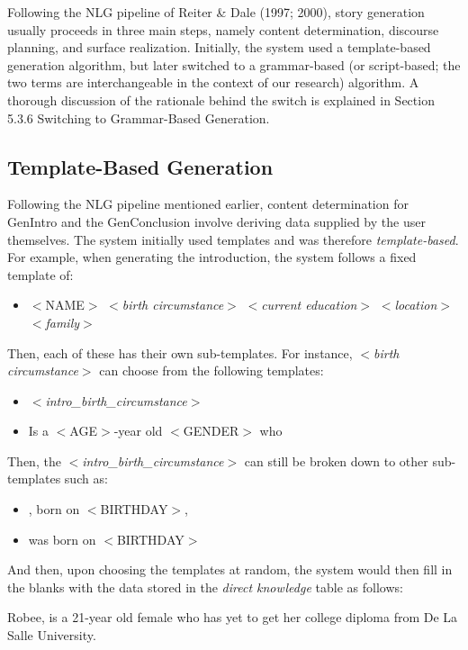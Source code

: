 Following the NLG pipeline of Reiter \& Dale (1997; 2000), story generation usually proceeds in three main steps, namely content determination, discourse planning, and surface realization. Initially, the system used a template-based generation algorithm, but later switched to a grammar-based (or script-based; the two terms are interchangeable in the context of our research) algorithm. A thorough discussion of the rationale behind the switch is explained in Section 5.3.6 Switching to Grammar-Based Generation.

\subsection{Template-Based Generation}
Following the NLG pipeline mentioned earlier, content determination for GenIntro and the GenConclusion involve deriving data supplied by the user themselves. The system initially used templates and was therefore \textit{template-based}. For example, when generating the introduction, the system follows a fixed template of:
\begin{itemize}
	\item $<$NAME$>$ $<$\textit{birth circumstance}$>$ $<$\textit{current education}$>$ $<$\textit{location}$>$ $<$\textit{family}$>$
\end{itemize}

Then, each of these has their own sub-templates. For instance, $<$\textit{birth circumstance}$>$ can choose from the following templates:
\begin{itemize}
	\item $<$\textit{intro\_birth\_circumstance}$>$
	\item Is a $<$AGE$>$-year old $<$GENDER$>$ who
\end{itemize}

Then, the $<$\textit{intro\_birth\_circumstance}$>$ can still be broken down to other sub-templates such as:
\begin{itemize}
	\item , born on $<$BIRTHDAY$>$,
	\item was born on $<$BIRTHDAY$>$
\end{itemize}

And then, upon choosing the templates at random, the system would then fill in the blanks with the data stored in the \textit{direct knowledge} table as follows:

\begin{center} Robee, is a 21-year old female who has yet to get her college diploma from De La Salle University. \end{center}


